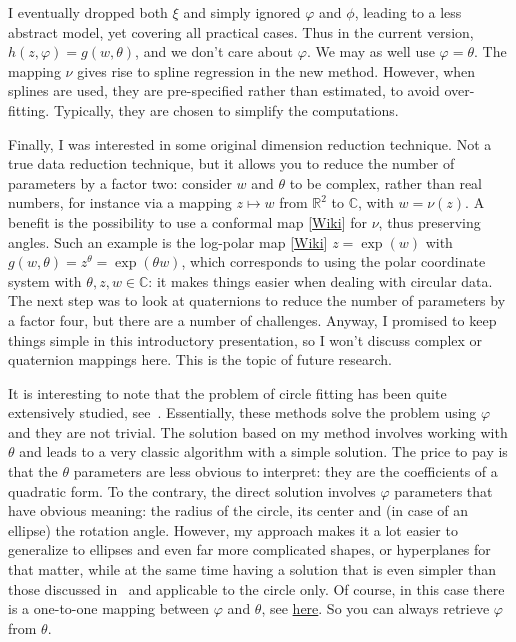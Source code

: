 \documentclass[oneside,10pt]{book}
\begin{document}
I eventually dropped both $\xi$ and simply ignored $\varphi$ and $\phi$, leading to a less abstract model, yet covering all practical cases.
Thus in the current version, $h(z,\varphi)=g(w,\theta)$, and we don't care about $\varphi$. We may as well use $\varphi=\theta$. The mapping $\nu$ gives rise to spline regression in the new method. However, when splines are used, they are pre-specified rather than estimated, to avoid over-fitting. Typically, they are chosen to simplify the computations.

Finally, I was interested in some original dimension reduction technique. Not a true data reduction technique, but it allows you to reduce the number of parameters by a factor two: consider $w$ and $\theta$ to be complex, rather than real numbers, for instance via a mapping $z \mapsto w$ from $\mathbb{R}^2$ to
$\mathbb{C}$, with $w=\nu(z)$. A benefit is the possibility to use
 a \textcolor{index}{conformal map} [\href{https://en.wikipedia.org/wiki/Conformal_map}{Wiki}] for $\nu$, thus preserving angles. Such an example is the \textcolor{index}{log-polar map} [\href{https://en.wikipedia.org/wiki/Log-polar_coordinates}{Wiki}] $z=\exp(w)$ with
$g(w,\theta)=z^\theta=\exp(\theta w)$, which corresponds to using the polar coordinate system with $\theta,z,w\in\mathbb{C}$: it makes things easier when dealing with circular data. The next step was to look at quaternions to reduce the number of parameters by a factor four, but there are a number of challenges. Anyway, I promised to keep things simple in this introductory
 presentation, so I won't discuss complex or quaternion mappings here. This is the topic of future research.

It is interesting to note that the problem of circle fitting has been quite extensively studied, see~\cite{ieee200y}. Essentially, these
 methods solve the problem using $\varphi$ and they are not trivial. The solution based on my method
 involves working with $\theta$ and leads to a very classic algorithm with a simple solution. The price to pay is that the $\theta$
 parameters are less obvious to interpret: they are the coefficients of a quadratic form. To the contrary, the direct solution
 involves $\varphi$ parameters that have obvious meaning: the radius of the circle, its center and (in case of an ellipse) the rotation angle.
However, my approach makes it a lot easier to generalize to ellipses
 and even far more complicated shapes, or hyperplanes for that matter, while at the same time having a solution that is even simpler than those discussed in~\cite{ieee200y} and applicable to
 the circle only. Of course, in this case there is a one-to-one mapping between $\varphi$ and $\theta$, see
 \href{https://math.stackexchange.com/questions/1810677/center-and-axis-of-quadratic-surface}{here}. So you can always retrieve
 $\varphi$ from $\theta$.
\end{document}
